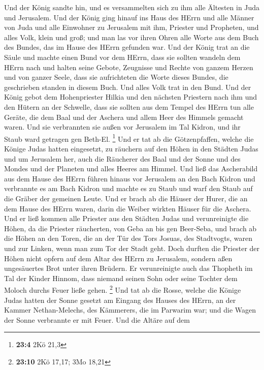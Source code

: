  Und der König sandte hin, und es versammelten sich zu ihm
alle Ältesten in Juda und Jerusalem.  Und der König ging
hinauf ins Haus des HErrn und alle Männer von Juda und alle Einwohner zu
Jerusalem mit ihm, Priester und Propheten, und alles Volk, klein und
groß; und man las vor ihren Ohren alle Worte aus dem Buch des Bundes,
das im Hause des HErrn gefunden war.  Und der König trat an
die Säule und machte einen Bund vor dem HErrn, dass sie sollten wandeln
dem HErrn nach und halten seine Gebote, Zeugnisse und Rechte von ganzem
Herzen und von ganzer Seele, dass sie aufrichteten die Worte dieses
Bundes, die geschrieben standen in diesem Buch. Und alles Volk trat in
den Bund.  Und der König gebot dem Hohenpriester Hilkia und
den nächsten Priestern nach ihm und den Hütern an der Schwelle, dass sie
sollten aus dem Tempel des HErrn tun alle Geräte, die dem Baal und der
Aschera und allem Heer des Himmels gemacht waren. Und sie verbrannten
sie außen vor Jerusalem im Tal Kidron, und ihr Staub ward getragen gen
Beth-El. \footnote{\textbf{23:4} 2Kö 21,3}  Und er tat ab
die Götzenpfaffen, welche die Könige Judas hatten eingesetzt, zu
räuchern auf den Höhen in den Städten Judas und um Jerusalem her, auch
die Räucherer des Baal und der Sonne und des Mondes und der Planeten und
alles Heeres am Himmel.  Und ließ das Ascherabild aus dem
Hause des HErrn führen hinaus vor Jerusalem an den Bach Kidron und
verbrannte es am Bach Kidron und machte es zu Staub und warf den Staub
auf die Gräber der gemeinen Leute.  Und er brach ab die
Häuser der Hurer, die an dem Hause des HErrn waren, darin die Weiber
wirkten Häuser für die Aschera.  Und er ließ kommen alle
Priester aus den Städten Judas und verunreinigte die Höhen, da die
Priester räucherten, von Geba an bis gen Beer-Seba, und brach ab die
Höhen an den Toren, die an der Tür des Tors Josuas, des Stadtvogts,
waren und zur Linken, wenn man zum Tor der Stadt geht.  Doch
durften die Priester der Höhen nicht opfern auf dem Altar des HErrn zu
Jerusalem, sondern aßen ungesäuertes Brot unter ihren Brüdern.
 Er verunreinigte auch das Thopheth im Tal der Kinder
Hinnom, dass niemand seinen Sohn oder seine Tochter dem Moloch durchs
Feuer ließe gehen. \footnote{\textbf{23:10} 2Kö 17,17; 3Mo 18,21}
 Und tat ab die Rosse, welche die Könige Judas hatten der
Sonne gesetzt am Eingang des Hauses des HErrn, an der Kammer
Nethan-Melechs, des Kämmerers, die im Parwarim war; und die Wagen der
Sonne verbrannte er mit Feuer.  Und die Altäre auf dem
